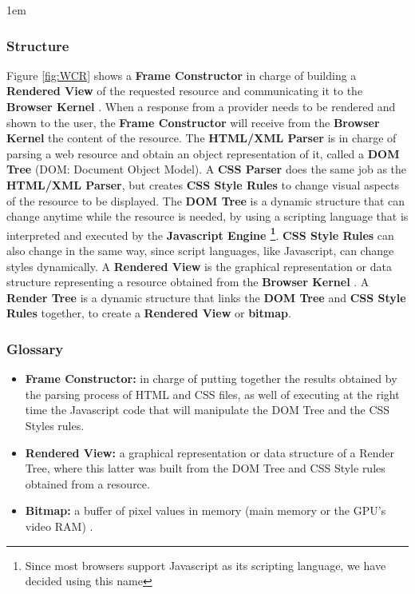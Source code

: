 \documentclass[]{acmlarge}
\begin{document}

    \leftskip1em

    \subsubsection*{Structure}
    Figure \ref{fig:WCR} shows a \textbf{Frame Constructor} in charge of building a \textbf{Rendered View} of the requested resource and communicating it to the \textbf{Browser Kernel} %
    . When a response from a provider needs to be rendered and shown to the user, the \textbf{Frame Constructor} will receive from the \textbf{Browser Kernel} %
    the content of the resource. The \textbf{HTML/XML Parser} is in charge of parsing a web resource and obtain an object representation of it, called a \textbf{DOM Tree} (DOM: Document Object Model). A \textbf{CSS Parser} does the same job as the \textbf{HTML/XML Parser}, but creates \textbf{CSS Style Rules} to change visual aspects of the resource to be displayed. The \textbf{DOM Tree} is a dynamic structure that can change anytime while the resource is needed, by using a scripting language that is interpreted and executed by the \textbf{Javascript Engine \footnote{Since most browsers support Javascript as its scripting language, we have decided using this name}}. \textbf{CSS Style Rules} can also change in the same way, since script languages, like Javascript, can change styles dynamically. A \textbf{Rendered View} is the graphical representation or data structure representing a resource obtained from the \textbf{Browser Kernel} %
    . A \textbf{Render Tree} is a dynamic structure that links the \textbf{DOM Tree} and \textbf{CSS Style Rules} together, to create a \textbf{Rendered View} or \textbf{bitmap}.

    \subsubsection*{Glossary}
      \begin{itemize}\leftskip0.2em
        \item \textbf{Frame Constructor:} in charge of putting together the results obtained by the parsing process of HTML and CSS files, as well of executing at the right time the Javascript code that will manipulate the DOM Tree and the CSS Styles rules. 
        \item \textbf{Rendered View:} a graphical representation  or data structure of a Render Tree, where this latter was built from the DOM Tree and CSS Style rules obtained from a resource.
        \item \textbf{Bitmap:} a buffer of pixel values in memory (main memory or the GPU’s video RAM) \cite{gpuchrome}.
      \end{itemize}
\end{document}
